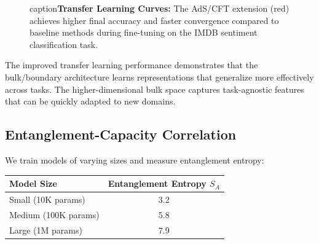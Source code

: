 \documentclass[12pt,a4paper]{article}
\begin{document}
\begin{figure}[htbp]
\centering
{}
caption{\textbf{Transfer Learning Curves:} The AdS/CFT extension 
         (red) achieves higher final accuracy and faster convergence 
         compared to baseline methods during fine-tuning on the IMDB 
         sentiment classification task.}
\label{fig:transfer_curves}
\end{figure}

The improved transfer learning performance demonstrates that the bulk/boundary architecture learns representations that generalize more effectively across tasks. The higher-dimensional bulk space captures task-agnostic features that can be quickly adapted to new domains.

\subsection{Entanglement-Capacity Correlation}

We train models of varying sizes and measure entanglement entropy:

\begin{table}[htbp]
\centering
\begin{tabular}{@{}lc@{}}
\toprule
\textbf{Model Size} & \textbf{Entanglement Entropy $S_A$} \\
\midrule
Small (10K params) & 3.2 \\
Medium (100K params) & 5.8 \\
Large (1M params) & 7.9 \\
\bottomrule
\end{tabular}
\end{table}
\end{document}
